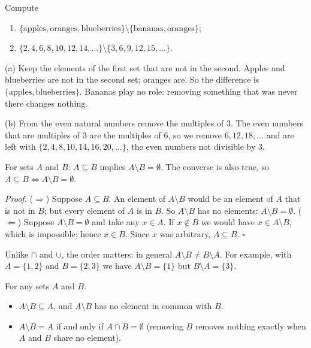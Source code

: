 \begin{example}
Compute
\begin{enumerate}
  \item $\{\text{apples},\text{oranges},\text{blueberries}\}\setminus\{\text{bananas},\text{oranges}\}$;
  \item $\{2,4,6,8,10,12,14,\dots\}\setminus\{3,6,9,12,15,\dots\}$.
\end{enumerate} 
\solution
(a) Keep the elements of the first set that are not in the second. Apples and blueberries are not in the
second set; oranges are. So the difference is $\{\text{apples},\text{blueberries}\}$. Bananas play no role:
removing something that was never there changes nothing.

(b) From the even natural numbers remove the multiples of $3$. The even numbers that are multiples of $3$
are the multiples of $6$, so we remove $6,12,18,\dots$ and are left with $\{2,4,8,10,14,16,20,\dots\}$, the
even numbers not divisible by $3$.
\end{example}

\begin{proposition}
For sets $A$ and $B$: $A\subseteq B$ implies $A\setminus B=\emptyset$.  The converse is
also true, so $A\subseteq B\Leftrightarrow A\setminus B=\emptyset$.
\end{proposition}
\emph{Proof.} ($\Rightarrow$) Suppose $A\subseteq B$. An element of $A\setminus B$ would be an element of $A$
that is not in $B$; but every element of $A$ is in $B$. So $A\setminus B$ has no elements:
$A\setminus B=\emptyset$.
($\Leftarrow$) Suppose $A\setminus B=\emptyset$ and take any $x\in A$. If $x\notin B$ we would have
$x\in A\setminus B$, which is impossible; hence $x\in B$. Since $x$ was arbitrary, $A\subseteq B$.
\hfill$\square$

\begin{warning}
Unlike $\cap$ and $\cup$, the order matters: in general $A\setminus B\ne B\setminus A$. For example, with
$A=\{1,2\}$ and $B=\{2,3\}$ we have $A\setminus B=\{1\}$ but $B\setminus A=\{3\}$.
\end{warning}

\begin{external}
For any sets $A$ and $B$:
\begin{itemize}
  \item $A\setminus B\subseteq A$, and $A\setminus B$ has no element in common with $B$.
  \item $A\setminus B=A$ if and only if $A\cap B=\emptyset$ (removing $B$ removes nothing exactly when $A$
  and $B$ share no element).
\end{itemize}
\end{external}

